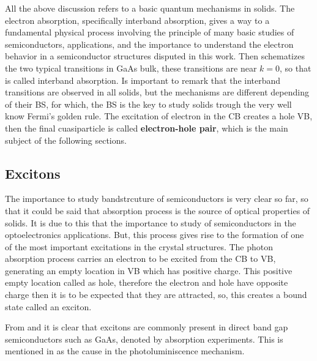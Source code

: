 All the above discussion refers to a basic quantum mechanisms in solids. The electron absorption, specifically interband absorption, gives a way to a fundamental physical process  involving the principle of many basic studies of semiconductors, applications, and the importance to understand the electron behavior in a semiconductor structures disputed in this work. Then  schematizes the two typical transitions in GaAs bulk, these transitions are near  $k=0$, so that is called interband absorption. Is important to remark that the interband transitions are observed in all solids, but the mechanisms are different depending of their BS, for which,   the BS is the key to study solids  trough the very well know Fermi's golden rule. The excitation of electron in the CB creates a hole VB, then the  final cuasiparticle is called \textbf{electron-hole pair}, which is the main subject of the following sections.


\subsection{Excitons}
\label{subsec:chapter-1-excitons}
\vspace{-10mm}
The importance to study bandstrcuture of semiconductors is very clear so far, so that it could be said that absorption process is the source of optical properties of solids. It is due to this that the importance to study of semiconductors in the optoelectronics applications. But, this process gives rise to the formation of one of the most important excitations in the crystal structures. The photon absorption process carries  an electron to be  excited from  the CB to VB, generating an empty location in VB which has positive charge. This positive empty location called as hole, therefore the electron and hole have opposite charge then it is  to be expected that they are attracted, so, this creates a bound state called an exciton\cite{leonard2017exciton}. 

From  and   it is clear that excitons are commonly present in direct band gap semiconductors such as GaAs, denoted by absorption experiments. This is  mentioned in  as the cause in the photoluminiscence mechanism.

